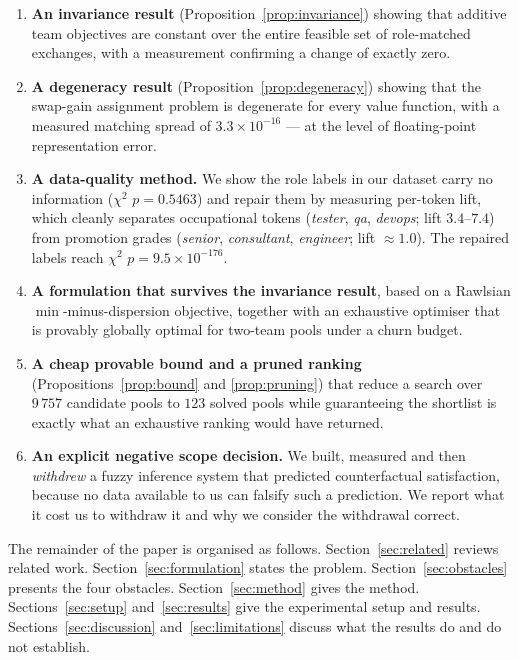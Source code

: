 \documentclass[conference]{IEEEtran}
\begin{document}
\begin{enumerate}
\item \textbf{An invariance result} (Proposition~\ref{prop:invariance}) showing
that additive team objectives are constant over the entire feasible set of
role-matched exchanges, with a measurement confirming a change of exactly zero.

\item \textbf{A degeneracy result} (Proposition~\ref{prop:degeneracy}) showing
that the swap-gain assignment problem is degenerate for every value function,
with a measured matching spread of $3.3\times10^{-16}$ --- at the level of
floating-point representation error.

\item \textbf{A data-quality method.} We show the role labels in our dataset carry
no information ($\chi^2$ $p=0.5463$) and repair them by measuring per-token lift,
which cleanly separates occupational tokens (\textit{tester}, \textit{qa},
\textit{devops}; lift $3.4$--$7.4$) from promotion grades (\textit{senior},
\textit{consultant}, \textit{engineer}; lift $\approx 1.0$). The repaired labels
reach $\chi^2$ $p=9.5\times10^{-176}$.

\item \textbf{A formulation that survives the invariance result}, based on a
Rawlsian $\min$-minus-dispersion objective, together with an exhaustive optimiser
that is provably globally optimal for two-team pools under a churn budget.

\item \textbf{A cheap provable bound and a pruned ranking}
(Propositions~\ref{prop:bound} and \ref{prop:pruning}) that reduce a search over
$9\,757$ candidate pools to $123$ solved pools while guaranteeing the shortlist
is exactly what an exhaustive ranking would have returned.

\item \textbf{An explicit negative scope decision.} We built, measured and then
\emph{withdrew} a fuzzy inference system that predicted counterfactual
satisfaction, because no data available to us can falsify such a prediction. We
report what it cost us to withdraw it and why we consider the withdrawal correct.
\end{enumerate}

The remainder of the paper is organised as follows.
Section~\ref{sec:related} reviews related work.
Section~\ref{sec:formulation} states the problem.
Section~\ref{sec:obstacles} presents the four obstacles.
Section~\ref{sec:method} gives the method.
Sections~\ref{sec:setup} and~\ref{sec:results} give the experimental setup and
results. Sections~\ref{sec:discussion} and~\ref{sec:limitations} discuss what the
results do and do not establish.
\end{document}
